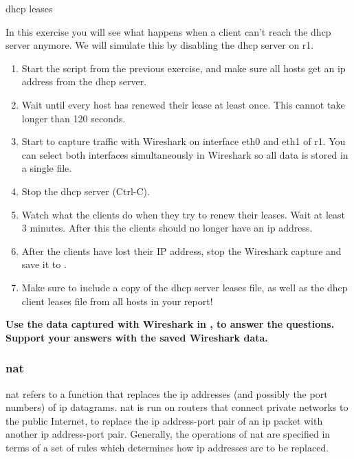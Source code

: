 \begin{exercise}{\ac{dhcp} leases}
	
In this exercise you will see what happens when a client can't reach the \ac{dhcp} server anymore. We will simulate this by disabling the \ac{dhcp} server on r1.
	
\begin{enumerate}
	\item Start the script from the previous exercise, and make sure all hosts get an \acs{ip} address from the \acs{dhcp} server.
	\item Wait until every host has renewed their lease at least once. This cannot take longer than 120 seconds.
	\item Start to capture traffic with Wireshark on interface eth0 and eth1 of r1. You can select both interfaces simultaneously in Wireshark so all data is stored in a single  file.
	\item Stop the \ac{dhcp} server (Ctrl-C).
	\item Watch what the clients do when they try to renew their leases. Wait at least 3 minutes. After this the clients should no longer have an \acs{ip} address.
	\item After the clients have lost their IP address, stop the Wireshark capture and save it to .
	\item Make sure to include a copy of the dhcp server leases file, as well as the dhcp client leases file from all hosts in your report!
\end{enumerate}

\textbf{Use the data captured with Wireshark in , to answer the questions. Support your answers with the saved Wireshark data.}


\end{exercise}

\subsubsection{\acf{nat}}

\acf{nat} refers to a function that replaces the \acs{ip} addresses (and possibly the port numbers) of \acs{ip} datagrams. \ac{nat} is run on routers that connect private networks to the public Internet, to replace the \acs{ip} address-port pair of an \acs{ip} packet with another \acs{ip} address-port pair. Generally, the operations of \ac{nat} are specified in terms of a set of rules which determines how \acs{ip} addresses are to be replaced.

